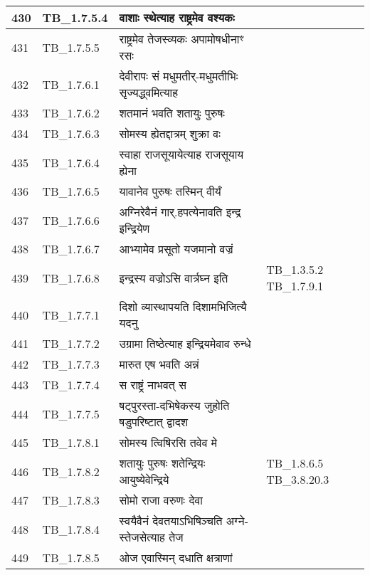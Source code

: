 \documentclass[17pt]{extarticle}
\begin{document}
\begin{longtable}{||p{0.4in}||p{0.9in}||p{4.0in}||p{0.9in}||}
        \hline
            430 & TB\_1.7.5.4 & वाशाः स्थेत्याह राष्ट्रमेव वश्यकः &      \\
        \hline
            431 & TB\_1.7.5.5 & राष्ट्रमेव तेजस्व्यकः अपामोषधीनाꣳ रसः &      \\
        \hline
            432 & TB\_1.7.6.1 & देवीरापः सं मधुमतीर्{-}मधुमतीभिः सृज्यद्ध्वमित्याह &      \\
        \hline
            433 & TB\_1.7.6.2 & शतमानं भवति शतायुः पुरुषः &      \\
        \hline
            434 & TB\_1.7.6.3 & सोमस्य ह्येतद्दात्रम् शुक्रा वः &      \\
        \hline
            435 & TB\_1.7.6.4 & स्वाहा राजसूयायेत्याह राजसूयाय ह्येना &      \\
        \hline
            436 & TB\_1.7.6.5 & यावानेव पुरुषः तस्मिन् वीर्यं &      \\
        \hline
            437 & TB\_1.7.6.6 & अग्निरेवैनं गार्.हपत्येनावति इन्द्र इन्द्रियेण &      \\
        \hline
            438 & TB\_1.7.6.7 & आभ्यामेव प्रसूतो यजमानो वज्रं &      \\
        \hline
            439 & TB\_1.7.6.8 & इन्द्रस्य वज्रोऽसि वार्त्रघ्न इति & TB\_1.3.5.2  TB\_1.7.9.1       \\
        \hline
            440 & TB\_1.7.7.1 & दिशो व्यास्थापयति दिशामभिजित्यै यदनु &      \\
        \hline
            441 & TB\_1.7.7.2 & उग्रामा तिष्ठेत्याह इन्द्रियमेवाव रुन्धे &      \\
        \hline
            442 & TB\_1.7.7.3 & मारुत एष भवति अन्नं &      \\
        \hline
            443 & TB\_1.7.7.4 & स राष्ट्रं नाभवत् स &      \\
        \hline
            444 & TB\_1.7.7.5 & षट्पुरस्ता{-}दभिषेकस्य जुहोति षडुपरिष्टात् द्वादश &      \\
        \hline
            445 & TB\_1.7.8.1 & सोमस्य त्विषिरसि तवेव मे &      \\
        \hline
            446 & TB\_1.7.8.2 & शतायुः पुरुषः शतेन्द्रियः आयुष्येवेन्द्रिये &  TB\_1.8.6.5 TB\_3.8.20.3       \\
        \hline
            447 & TB\_1.7.8.3 & सोमो राजा वरुणः देवा &      \\
        \hline
            448 & TB\_1.7.8.4 & स्वयैवैनं देवतयाऽभिषिञ्चति अग्ने{-}स्तेजसेत्याह तेज &      \\
        \hline
            449 & TB\_1.7.8.5 & ओज एवास्मिन् दधाति क्षत्राणां &      \\

\end{longtable}
\end{document}
